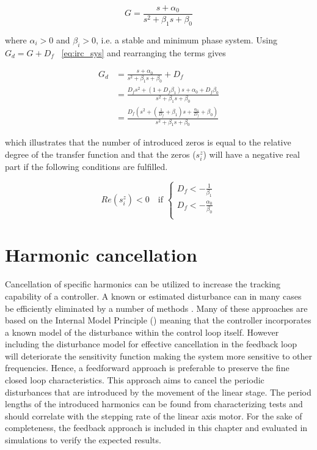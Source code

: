\begin{equation}
  \label{eq:irc_sys}
  G = \frac{s + \alpha_0}{s^2 + \beta_1s + \beta_0}
\end{equation}

where  $\alpha_i > 0$ and  $\beta_i > 0$, i.e. a stable and minimum phase system.  Using $G_d = G + D_f$  ~\eqref{eq:irc_sys} and rearranging the terms gives

\begin{equation}
  \label{eq:irc_sys_d}
  \begin{split}
  G_d & = \frac{s + \alpha_0}{s^2 + \beta_1s + \beta_0} + D_f \\
      & = \frac{D_fs^2 + (1 + D_f\beta_1)s + \alpha_0 + D_f\beta_0}{s^2 + \beta_1s + \beta_0} \\
      & = \frac{D_f(s^2 + (\frac{1}{D_f} + \beta_1)s + \frac{\alpha_0}{D_f} + \beta_0)}{s^2 + \beta_1s + \beta_0}
  \end{split}
\end{equation}

which illustrates that the number of introduced zeros is equal to the relative degree of the transfer function and that the zeros ($s^z_i$) will have a negative real part if the following conditions are fulfilled.

\begin{equation}
  \label{eq:irc_cond}
  Re(s^z_i) < 0 \quad \text{if }
  \begin{cases}
    D_f < -\frac{1}{\beta_1}\\
    D_f < -\frac{\alpha_0}{\beta_0}\\
  \end{cases}
\end{equation}

\section{Harmonic cancellation}
Cancellation of specific harmonics can be utilized to increase the tracking capability of a controller. A known or estimated disturbance can in many cases be efficiently eliminated by a number of methods \citep{fujimoto2009rro} \citep{fujimoto2004repetitive} \citep{vilanova2008disturbance}. Many of these approaches are based on the Internal Model Principle (\abbrIMP) meaning that the controller incorporates a known model of the disturbance within the control loop itself. However including the disturbance model for effective cancellation in the feedback loop will deteriorate the sensitivity function making the system more sensitive to other frequencies. Hence, a feedforward approach is preferable to preserve the fine closed loop characteristics. This approach aims to cancel the periodic disturbances that are introduced by the movement of the linear stage. The period lengths of the introduced harmonics can be found  from characterizing tests and should correlate with the stepping rate of the linear axis motor. For the sake of completeness, the \abbrIMP feedback approach is included in this chapter and evaluated in simulations to verify the expected results.

